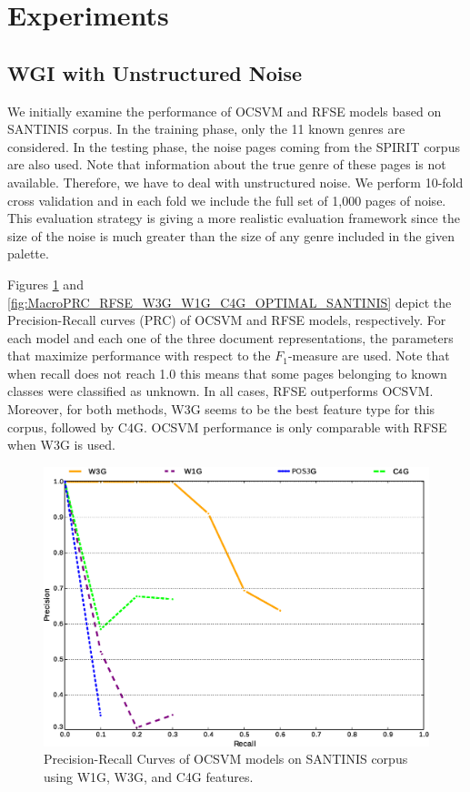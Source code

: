 \section{Experiments}\label{sec:Experiments_Results}
\subsection{WGI with Unstructured Noise}\label{sec:WGI_noise}

We initially examine the performance of OCSVM and RFSE models based on SANTINIS corpus. In the training phase, only the 11 known genres are considered. In the testing phase, the noise pages coming from the SPIRIT corpus are also used. Note that information about the true genre of these pages is not available. Therefore, we have to deal with unstructured noise. We perform  10-fold cross validation and in each fold we include the full set of 1,000 pages of noise. This evaluation strategy is giving a more realistic evaluation framework since the size of the noise is much greater than the size of any genre included in the given palette.

Figures \ref{fig:MacroPRC_OCSVME_W3G_W1G_C4G_OPTIMAL_SANTINIS} and \ref{fig:MacroPRC_RFSE_W3G_W1G_C4G_OPTIMAL_SANTINIS} depict the Precision-Recall curves (PRC) of OCSVM and RFSE models, respectively. For each model and each one of the three document representations, the parameters that maximize performance with respect to the $F_{1}$-measure are used. Note that when recall does not reach 1.0 this means that some pages belonging to known classes were classified as unknown. In all cases, RFSE outperforms OCSVM. Moreover, for both methods, W3G seems to be the best feature type for this corpus, followed by C4G. OCSVM performance is only comparable with RFSE when W3G is used.

\hfill \break


\begin{figure}[H]
\begin{center}
    \includegraphics[scale=0.38]{diagrams/OCSME_Best_per_DocRep.eps}
	\caption{Precision-Recall Curves of OCSVM models on SANTINIS corpus using W1G, W3G, and C4G features.}
	\label{fig:MacroPRC_OCSVME_W3G_W1G_C4G_OPTIMAL_SANTINIS}
	\end{center}
\end{figure}

